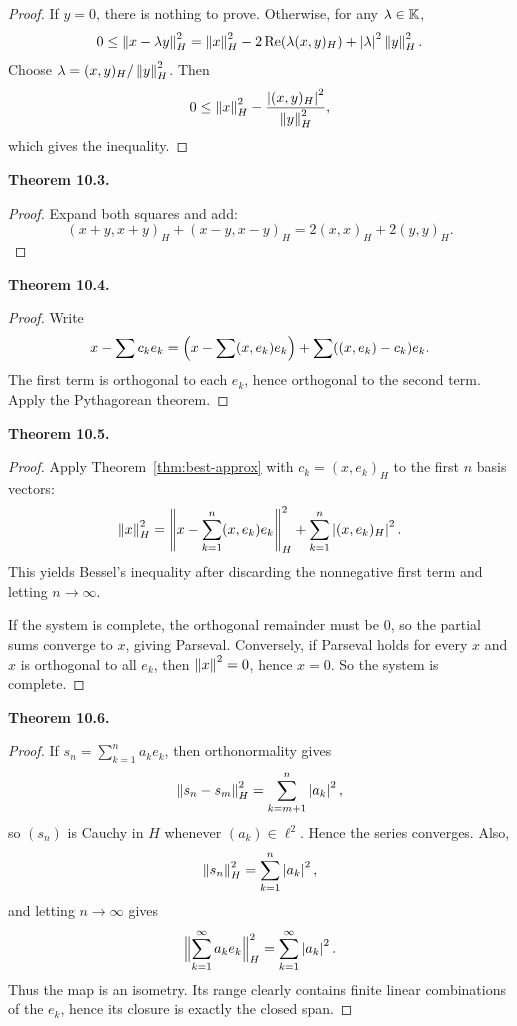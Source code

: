 \documentclass[11pt]{article}
\newenvironment{theoremstmt}[1]{%
  \par\medskip\noindent\textbf{Theorem #1. }\itshape
}{\par\medskip}
\begin{document}
\begin{proof}
If $y=0$, there is nothing to prove. Otherwise, for any $\lambda\in\mathbb{K}$,
\[
0\le \left\lVert x-\lambda y\right\rVert_H^2=\left\lVert x\right\rVert_H^2-2\operatorname{Re}(\lambda(x,y)_H)+\left\lvert \lambda\right\rvert^2\left\lVert y\right\rVert_H^2.
\]
Choose $\lambda=(x,y)_H/\left\lVert y\right\rVert_H^2$. Then
\[
0\le \left\lVert x\right\rVert_H^2-\frac{\left\lvert (x,y)_H\right\rvert^2}{\left\lVert y\right\rVert_H^2},
\]
which gives the inequality.
\end{proof}

\begin{theoremstmt}{10.3}
\thmParallelogram
\end{theoremstmt}

\begin{proof}
Expand both squares and add:
\[
(x+y,x+y)_H+(x-y,x-y)_H=2(x,x)_H+2(y,y)_H.
\]
\end{proof}

\begin{theoremstmt}{10.4}
\thmBestApprox
\end{theoremstmt}

\begin{proof}
Write
\[
x-\sum c_ke_k = \Bigl(x-\sum (x,e_k)e_k\Bigr)+\sum ((x,e_k)-c_k)e_k.
\]
The first term is orthogonal to each $e_k$, hence orthogonal to the second term. Apply the Pythagorean theorem.
\end{proof}

\begin{theoremstmt}{10.5}
\thmBesselParseval
\end{theoremstmt}

\begin{proof}
Apply Theorem~\ref{thm:best-approx} with $c_k=(x,e_k)_H$ to the first $n$ basis vectors:
\[
\left\lVert x\right\rVert_H^2=\left\lVert x-\sum_{k=1}^n(x,e_k)e_k\right\rVert_H^2+\sum_{k=1}^n\left\lvert (x,e_k)_H\right\rvert^2.
\]
This yields Bessel's inequality after discarding the nonnegative first term and letting $n\to\infty$.

If the system is complete, the orthogonal remainder must be $0$, so the partial sums converge to $x$, giving Parseval. Conversely, if Parseval holds for every $x$ and $x$ is orthogonal to all $e_k$, then $\left\lVert x\right\rVert^2=0$, hence $x=0$. So the system is complete.
\end{proof}

\begin{theoremstmt}{10.6}
\thmEllTwoIsometry
\end{theoremstmt}

\begin{proof}
If $s_n=\sum_{k=1}^n a_ke_k$, then orthonormality gives
\[
\left\lVert s_n-s_m\right\rVert_H^2=\sum_{k=m+1}^n \left\lvert a_k\right\rvert^2,
\]
so $(s_n)$ is Cauchy in $H$ whenever $(a_k)\in\ell^2$. Hence the series converges. Also,
\[
\left\lVert s_n\right\rVert_H^2=\sum_{k=1}^n \left\lvert a_k\right\rvert^2,
\]
and letting $n\to\infty$ gives
\[
\Bigl\|\sum_{k=1}^{\infty} a_ke_k\Bigr\|_H^2=\sum_{k=1}^{\infty}\left\lvert a_k\right\rvert^2.
\]
Thus the map is an isometry. Its range clearly contains finite linear combinations of the $e_k$, hence its closure is exactly the closed span.
\end{proof}
\end{document}
